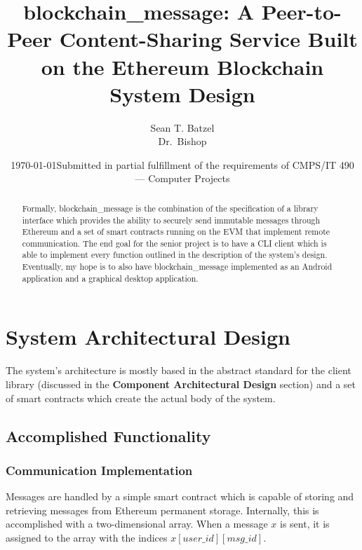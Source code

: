 \documentclass[titlepage]{report}
\title{blockchain\_message: A Peer-to-Peer Content-Sharing Service Built on the Ethereum Blockchain\\\large System Design}
\author{Sean T. Batzel\\Dr.\ Bishop}
\date{\today\endgraf\bigskip Submitted in partial fulfillment of the requirements of CMPS/IT 490 --- Computer Projects}
\begin{document}
\maketitle

\tableofcontents

\nocite{*}

\begin{abstract}
    Formally, blockchain\_message is the combination of the specification of a library interface which provides the ability to securely send immutable messages through \gls{Ethereum} and a set of smart contracts running on the EVM that implement remote communication. The end goal for the senior project is to have a CLI client which is able to implement every function outlined in the description of the system's design. Eventually, my hope is to also have blockchain\_message implemented as an Android application and a graphical desktop application.
\end{abstract}

\section{System Architectural Design}
The system's architecture is mostly based in the abstract standard for the client library (discussed in the \textbf{Component Architectural Design} section) and a set of \glspl{smart contract} which create the actual body of the system.

\subsection{Accomplished Functionality}
\subsubsection{Communication Implementation}
Messages are handled by a simple \gls{smart contract} which is capable of storing and retrieving messages from \gls{Ethereum} permanent storage. Internally, this is accomplished with a two-dimensional array. When a message $x$ is sent, it is assigned to the array with the indices $x[user\_id][msg\_id]$.
\end{document}

